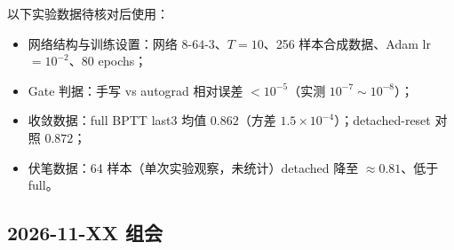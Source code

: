 \documentclass[journal,12pt,onecolumn]{IEEEtran}
\begin{document}
以下实验数据待核对后使用：

\begin{itemize}[leftmargin=1.5em,itemsep=0pt]
\item 网络结构与训练设置：网络 $8\text{-}64\text{-}3$、$T=10$、256 样本合成数据、Adam lr$=10^{-2}$、80 epochs；
\item Gate 判据：手写 vs autograd 相对误差 $<10^{-5}$（实测 $10^{-7}\sim10^{-8}$）；
\item 收敛数据：full BPTT last3 均值 $0.862$（方差 $1.5\times10^{-4}$）；detached-reset 对照 $0.872$；
\item 伏笔数据：64 样本（单次实验观察，未统计）detached 降至 $\approx0.81$、低于 full。
\end{itemize}

\subsection{2026-11-XX 组会}




\end{document}
